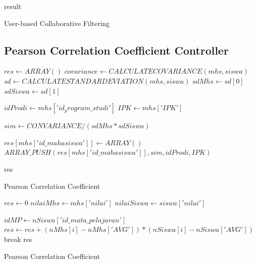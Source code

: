 \begin{algorithm}[H]
  \begin{algorithmic}[1]
        \State \Return result
    \EndProcedure
  \end{algorithmic} 
  \caption{User-based Collaborative Filtering}
  \label{alg:getResult user-based}
\end{algorithm}

\subsection{Pearson Correlation Coefficient Controller}
\label{subsec:pearson}

\begin{algorithm}[H]
  \begin{algorithmic}[1]
        \State $res \gets ARRAY()$
            \State $covariance \gets CALCULATECOVARIANCE(mhs, siswa)$
            \State $sd \gets CALCULATESTANDARDEVIATION(mhs,siswa)$
            \State $sdMhs \gets sd[0]$
            \State $sdSiswa \gets sd[1]$
            
            \State $idProdi \gets mhs['id_program\_studi']$
            \State $IPK \gets mhs['IPK']$
            
            \State $sim \gets CONVARIANCE / (sdMhs * sdSiswa)$
            
                \State $res[mhs['id\_mahasiswa']] \gets ARRAY()$
                \State $ARRAY\_PUSH(res[mhs['id\_mahasiswa']], sim, idProdi, IPK)$
            \EndIf
        \EndFor
    
        \State \Return res
    \EndProcedure
  \end{algorithmic} 
  \caption{Pearson Correlation Coefficient}
  \label{alg:calculatePearson pearson}
\end{algorithm}

\begin{algorithm}[H]
  \begin{algorithmic}[1]
        \State $res \gets 0$
        \State $nilaiMhs \gets mhs['nilai']$
        \State $nilaiSiswa \gets siswa['nilai']$
        
            \State $idMP \gets nSiswa['id\_mata\_pelajaran']$
                        \State $res \gets res +  (nMhs[i]-nMhs['AVG'])*(nSiswa[i]-nSiswa['AVG'])$
                    \EndFor
                    \State break
                \EndIf
            \EndFor
        \EndFor
        \State \Return res
    \EndProcedure
  \end{algorithmic} 
  \caption{Pearson Correlation Coefficient}
  \label{alg:calculateCovariance pearson}
\end{algorithm}

